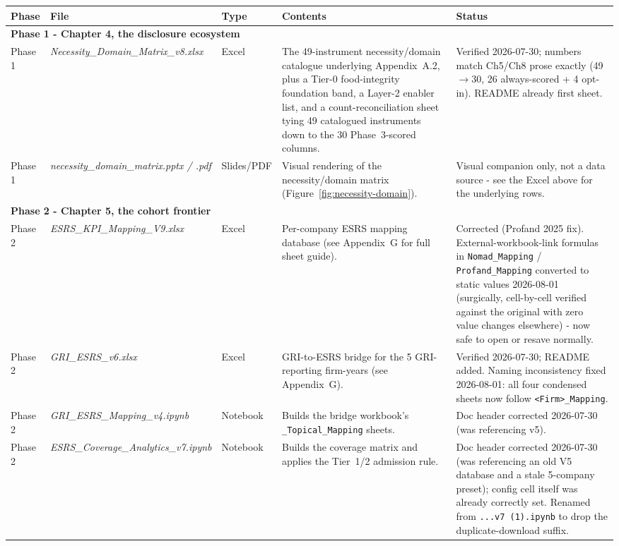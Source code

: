 \documentclass[
]{article}
\newcommand{\fb}{\discretionary{}{}{}} %
\begin{document}
\begin{landscape}\footnotesize\setlength{\tabcolsep}{4pt}\renewcommand{\arraystretch}{1.15}
\begin{longtable}{p{2.5cm}p{3.8cm}p{1.0cm}p{5.2cm}p{3.7cm}}
\toprule \textbf{Phase} & \textbf{File} & \textbf{Type} & \textbf{Contents} & \textbf{Status} \\ \midrule \endhead
\multicolumn{5}{l}{\rule{0pt}{1.1em}\textbf{Phase 1 - Chapter 4, the disclosure ecosystem}}\\[1pt]
Phase 1 & \emph{Necessity\_\fb Domain\_\fb Matrix\_\fb v8.xlsx} & Excel & The 49-instrument necessity/domain catalogue underlying Appendix~A.2, plus a Tier-0 food-integrity foundation band, a Layer-2 enabler list, and a count-reconciliation sheet tying 49 catalogued instruments down to the 30 Phase~3-scored columns. & Verified 2026-07-30; numbers match Ch5/Ch8 prose exactly (49$\to$30, 26 always-scored + 4 opt-in). README already first sheet. \\
Phase 1 & \emph{necessity\_\fb domain\_\fb matrix.pptx / .pdf} & Slides/PDF & Visual rendering of the necessity/domain matrix (Figure~\ref{fig:necessity-domain}). & Visual companion only, not a data source - see the Excel above for the underlying rows. \\
\multicolumn{5}{l}{\rule{0pt}{1.1em}\textbf{Phase 2 - Chapter 5, the cohort frontier}}\\[1pt]
Phase 2 & \emph{ESRS\_\fb KPI\_\fb Mapping\_\fb V9.xlsx} & Excel & Per-company ESRS mapping database (see Appendix~G for full sheet guide). & Corrected (Profand 2025 fix). External-workbook-link formulas in \texttt{Nomad\_Mapping} / \texttt{Profand\_Mapping} converted to static values 2026-08-01 (surgically, cell-by-cell verified against the original with zero value changes elsewhere) - now safe to open or resave normally. \\
Phase 2 & \emph{GRI\_\fb ESRS\_\fb v6.xlsx} & Excel & GRI-to-ESRS bridge for the 5 GRI-reporting firm-years (see Appendix~G). & Verified 2026-07-30; README added. Naming inconsistency fixed 2026-08-01: all four condensed sheets now follow \texttt{<Firm>\_Mapping}. \\
Phase 2 & \emph{GRI\_\fb ESRS\_\fb Mapping\_\fb v4.ipynb} & Notebook & Builds the bridge workbook's \texttt{\_Topical\_Mapping} sheets. & Doc header corrected 2026-07-30 (was referencing v5). \\
Phase 2 & \emph{ESRS\_\fb Coverage\_\fb Analytics\_\fb v7.ipynb} & Notebook & Builds the coverage matrix and applies the Tier~1/2 admission rule. & Doc header corrected 2026-07-30 (was referencing an old V5 database and a stale 5-company preset); config cell itself was already correctly set. Renamed from \texttt{...v7 (1).ipynb} to drop the duplicate-download suffix. \\

\end{longtable}
\end{landscape}
\end{document}
